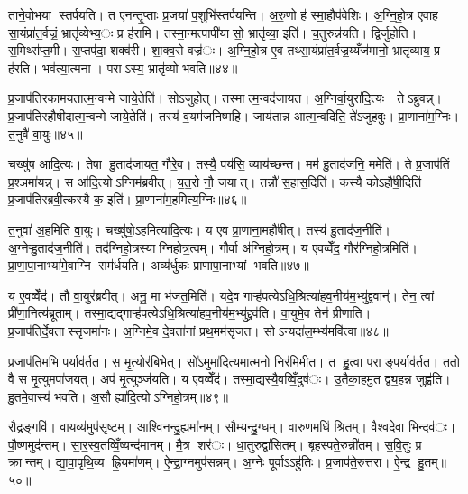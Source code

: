 ताने॒वोभया स्तर्पयति। त ए॑नन्तृ॒प्ताः प्र॒जया॑ प॒शुभि॑स्तर्पयन्ति। अ॒रु॒णो ह॑ स्मा॒हौप॑वेशिः। अ॒ग्नि॒हो॒त्र ए॒वाह सा॒यंप्रा॑त॒र्वज्रं॒ भ्रातृ॑व्येभ्य॒ः प्र ह॑रामि। तस्मा॒न्मत्पापी॑यासो॒ भ्रातृ॑व्या॒ इति॑। च॒तुरुन्न॑यति। द्विर्जु॑होति। स॒मिथ्स॑प्त॒मी। स॒प्तप॑दा॒ शक्व॑री। शा॒क्व॒रो वज्र॑ः। अ॒ग्नि॒हो॒त्र ए॒व तथ्सा॒यंप्रा॑त॒र्वज्र॒य्यँज॑मानो॒ भ्रातृ॑व्याय॒ प्र ह॑रति। भव॑त्या॒त्मना। पराऽस्य॒ भ्रातृ॑व्यो भवति॥४४॥


प्र॒जाप॑तिरकामयतात्म॒न्वन्मे॑ जाये॒तेति॑। सो॑ऽजुहोत्। तस्मात्म॒न्वद॑जायत। अ॒ग्निर्वा॒युरा॑दि॒त्यः। तेऽब्रुवन्न्। प्र॒जाप॑तिरहौषीदात्म॒न्वन्मे॑ जाये॒तेति॑। तस्य॑ व॒यम॑जनिष्महि। जाय॑तान्न आत्म॒न्वदिति॒ ते॑ऽजुहवुः। प्रा॒णाना॑म॒ग्निः। त॒नुवै॑ वा॒युः॥४५॥

चख्षु॑ष आदि॒त्यः। तेषा हु॒ताद॑जायत॒ गौरे॒व। तस्यै॒ पय॑सि॒ व्याय॑च्छन्त। मम॑ हु॒ताद॑जनि॒ ममेति॑। ते प्र॒जाप॑तिं प्र॒श्ञमा॑यन्न्। स आ॑दि॒त्योऽग्निम॑ब्रवीत्। य॒त॒रो नौ॒ जयात्। तन्नौ॑ स॒हास॒दिति॑। कस्यै कोऽहौ॑षी॒दिति॑ प्र॒जाप॑तिरब्रवी॒त्कस्यै क॒ इति॑। प्रा॒णाना॑म॒हमित्य॒ग्निः॥४६॥

त॒नुवा॑ अ॒हमिति॑ वा॒युः। चख्षु॑षो॒ऽहमित्या॑दि॒त्यः। य ए॒व प्रा॒णाना॒महौ॑षीत्। तस्य॑ हु॒ताद॑ज॒नीति॑। अ॒ग्नेऱ्हु॒ताद॑ज॒नीति॑। तद॑ग्निहो॒त्रस्याग्निहोत्र॒त्वम्। गौर्वा अ॑ग्निहो॒त्रम्। य ए॒वव्वेँद॒ गौर॑ग्निहो॒त्रमिति॑। प्रा॒णा॒पा॒नाभ्या॑मे॒वाग्नि सम॑र्धयति। अव्य॑र्धुकः प्राणापा॒नाभ्यां भवति॥४७॥

य ए॒वव्वेँद॑। तौ वा॒युर॑ब्रवीत्। अनु॒ मा भ॑जत॒मिति॑। यदे॒व गाऱ्ह॑पत्येऽधि॒श्रित्या॑हव॒नीय॑म॒भ्यु॑द्द्रवान्॑। तेन॒ त्वां प्री॑णा॒नित्य॑ब्रूताम्। तस्मा॒द्यद्गाऱ्ह॑पत्येऽधि॒श्रित्या॑हव॒नीय॑म॒भ्यु॑द्द्रव॑ति। वा॒युमे॒व तेन॑ प्रीणाति। प्र॒जाप॑तिर्दे॒वतास्सृ॒जमा॑नः। अ॒ग्निमे॒व दे॒वता॑नां प्रथ॒मम॑सृजत। सोऽन्यदा॑ल॒म्भ्य॑मवि॑त्वा॥४८॥

प्र॒जाप॑तिम॒भि प॒र्याव॑र्तत। स मृ॒त्योर॑बिभेत्। सो॑ऽमुमा॑दि॒त्यमा॒त्मनो॒ निर॑मिमीत। त हु॒त्वा पराङ्प॒र्याव॑र्तत। ततो॒ वै स मृ॒त्युमपा॑जयत्। अप॑ मृ॒त्युञ्ज॑यति। य ए॒वव्वेँद॑। तस्मा॒द्यस्यै॒वव्विँ॒दुष॑ः। उ॒तैका॒हमु॒त द्व्य॒हन्न जुह्व॑ति। हु॒तमे॒वास्य॑ भवति। अ॒सौ ह्या॑दि॒त्योऽग्निहो॒त्रम्॥४९॥


रौ॒द्रङ्गवि॑। वा॒य॒व्य॑मुप॑सृष्टम्। आ॒श्वि॒नन्दु॒ह्यमा॑नम्। सौ॒म्यन्दु॒ग्धम्। वा॒रु॒णमधि॑ श्रितम्। वै॒श्व॒दे॒वा भि॒न्दव॑ः। पौ॒ष्णमुद॑न्तम्। सा॒र॒स्व॒तव्विँ॒ष्यन्द॑मानम्। मै॒त्र शर॑ः। धा॒तुरुद्वा॑सितम्। बृह॒स्पते॒रुन्नी॑तम्। स॒वि॒तुः प्र क्रान्तम्। द्या॒वा॒पृ॒थि॒व्य ह्रि॒यमा॑णम्। ऐ॒न्द्रा॒ग्नमुप॑सन्नम्। अ॒ग्नेः पूर्वाऽऽहु॑तिः। प्र॒जाप॑ते॒रुत्त॑रा। ऐ॒न्द्र हु॒तम्॥५०॥


